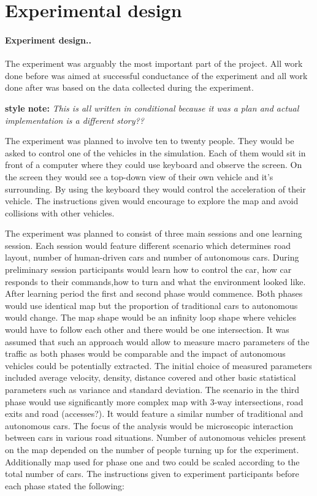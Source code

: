 \documentclass[11pt,english]{article}
\begin{document}
\section{Experimental design}

\paragraph{Experiment design..}



The experiment was arguably the most important part of the project. All work done before was aimed at successful conductance of the experiment and all work done after was based on the data collected during the experiment. 


\textbf{style note:} \textit{This is all written in conditional because it was a plan and actual implementation is a different story??}

The experiment was planned to involve ten to twenty people. They would be asked to control one of the vehicles in the simulation. Each of them would sit in front of a computer where they could use keyboard and observe the screen. On the screen they would see a top-down view of their own vehicle and it's surrounding. By using the keyboard they would control the acceleration of their vehicle. The instructions given would encourage to explore the map and avoid collisions with other vehicles.

The experiment was planned to consist of three main sessions and one learning session. Each session would feature different scenario which determines road layout, number of human-driven cars and number of autonomous cars. During preliminary session participants would learn how to control the car, how car responds to their commands,how to turn and what the environment looked like. 
After learning period the first and second phase would commence. Both phases would use identical map but the proportion of traditional cars to autonomous would change. The map shape would be an infinity loop shape where vehicles would have to follow each other and there would be one intersection. It was assumed that such an approach would allow to measure macro parameters of the traffic as both phases would be comparable and the impact of autonomous vehicles could be potentially extracted. The initial choice of measured parameters included average velocity, density, distance covered and other basic statistical parameters such as variance and standard deviation. The scenario in the third phase would use significantly more complex map with 3-way  intersections, road exits and road (accesses?). It would feature a similar number of traditional and autonomous cars. The focus of the analysis would be microscopic interaction between cars in various road situations. 
Number of autonomous vehicles present on the map depended on the number of people turning up for the experiment. Additionally map used for phase one and two could be scaled according to the total number of cars. The instructions given to experiment participants before each phase stated the following:
\end{document}
